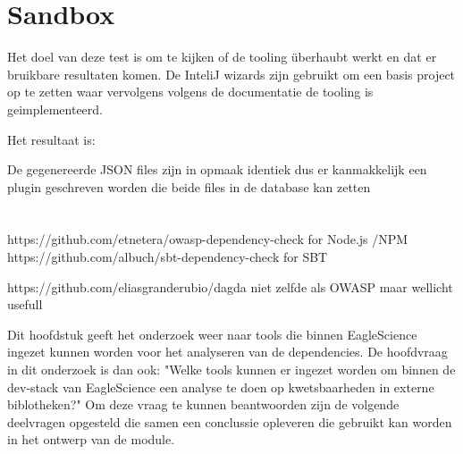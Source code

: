 \section{Sandbox}
Het doel van deze test is om te kijken of de tooling überhaubt werkt en dat er bruikbare resultaten komen. De InteliJ wizards zijn gebruikt om een basis project op te zetten waar vervolgens volgens de documentatie de tooling is geimplementeerd.

Het resultaat is:

De gegenereerde JSON files zijn in opmaak identiek dus er kanmakkelijk een plugin geschreven worden die beide files in de database kan zetten
\section{}

https://github.com/etnetera/owasp-dependency-check for Node.js /NPM
https://github.com/albuch/sbt-dependency-check for SBT

https://github.com/eliasgranderubio/dagda niet zelfde als OWASP maar wellicht usefull


Dit hoofdstuk geeft het onderzoek weer naar tools die binnen EagleScience ingezet kunnen worden voor het analyseren van de dependencies. De hoofdvraag in dit onderzoek is dan ook: "Welke tools kunnen er ingezet worden om binnen de dev-stack van EagleScience een analyse te doen op kwetsbaarheden in externe biblotheken?" Om deze vraag te kunnen beantwoorden zijn de volgende deelvragen opgesteld die samen een conclussie opleveren die gebruikt kan worden in het ontwerp van de module.



